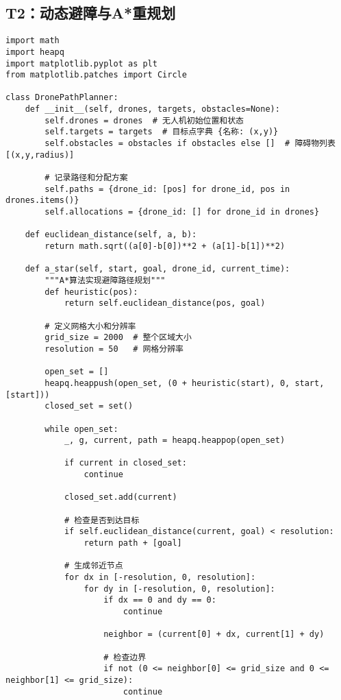 \documentclass[12pt,fontset=adobe]{ctexart}
\begin{document}
\subsection*{T2：动态避障与A*重规划}
\begin{verbatim}
import math
import heapq
import matplotlib.pyplot as plt
from matplotlib.patches import Circle

class DronePathPlanner:
    def __init__(self, drones, targets, obstacles=None):
        self.drones = drones  # 无人机初始位置和状态
        self.targets = targets  # 目标点字典 {名称: (x,y)}
        self.obstacles = obstacles if obstacles else []  # 障碍物列表 [(x,y,radius)]
        
        # 记录路径和分配方案
        self.paths = {drone_id: [pos] for drone_id, pos in drones.items()}
        self.allocations = {drone_id: [] for drone_id in drones}
        
    def euclidean_distance(self, a, b):
        return math.sqrt((a[0]-b[0])**2 + (a[1]-b[1])**2)
    
    def a_star(self, start, goal, drone_id, current_time):
        """A*算法实现避障路径规划"""
        def heuristic(pos):
            return self.euclidean_distance(pos, goal)
        
        # 定义网格大小和分辨率
        grid_size = 2000  # 整个区域大小
        resolution = 50   # 网格分辨率
        
        open_set = []
        heapq.heappush(open_set, (0 + heuristic(start), 0, start, [start]))
        closed_set = set()
        
        while open_set:
            _, g, current, path = heapq.heappop(open_set)
            
            if current in closed_set:
                continue
                
            closed_set.add(current)
            
            # 检查是否到达目标
            if self.euclidean_distance(current, goal) < resolution:
                return path + [goal]
            
            # 生成邻近节点
            for dx in [-resolution, 0, resolution]:
                for dy in [-resolution, 0, resolution]:
                    if dx == 0 and dy == 0:
                        continue
                        
                    neighbor = (current[0] + dx, current[1] + dy)
                    
                    # 检查边界
                    if not (0 <= neighbor[0] <= grid_size and 0 <= neighbor[1] <= grid_size):
                        continue
                    

\end{verbatim}
\end{document}
